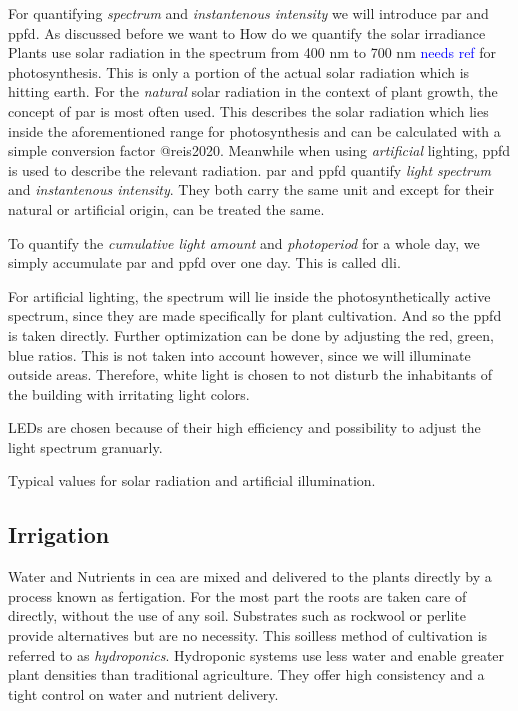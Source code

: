 For quantifying \textit{spectrum} and \textit{instantenous intensity} we will introduce \ac{par} and \ac{ppfd}.
As discussed before we want to 
How do we quantify the solar irradiance 
Plants use solar radiation in the spectrum from 400 nm to 700 nm \textcolor{Blue}{needs ref} for photosynthesis.
This is only a portion of the actual solar radiation which is hitting earth.
For the \textit{natural} solar radiation in the context of plant growth, the concept of \ac{par} is most often used.
This describes the solar radiation which lies inside the aforementioned range for photosynthesis and can be calculated with a simple conversion factor @reis2020.
Meanwhile when using \textit{artificial} lighting, \ac{ppfd} is used to describe the relevant radiation.
\ac{par} and \ac{ppfd} quantify \textit{light spectrum} and \textit{instantenous intensity}.
They both carry the same unit and except for their natural or artificial origin, can be treated the same.

To quantify the \textit{cumulative light amount} and \textit{photoperiod} for a whole day, we simply accumulate \ac{par} and \ac{ppfd} over one day.
This is called \ac{dli}.

For artificial lighting, the spectrum will lie inside the photosynthetically active spectrum, since they are made specifically for plant cultivation.
And so the ppfd is taken directly.
Further optimization can be done by adjusting the red, green, blue ratios.
This is not taken into account however, since we will illuminate outside areas.
Therefore, white light is chosen to not disturb the inhabitants of the building with irritating light colors.

LEDs are chosen because of their high efficiency and possibility to adjust the light spectrum granuarly.

Typical values for solar radiation and artificial illumination.



\subsection{Irrigation}
Water and Nutrients in \ac{cea} are mixed and delivered to the plants directly by a process known as fertigation.
For the most part the roots are taken care of directly, without the use of any soil.
Substrates such as rockwool or perlite provide alternatives but are no necessity.
This soilless method of cultivation is referred to as \textit{hydroponics}.
Hydroponic systems use less water and enable greater plant densities than traditional agriculture.
They offer high consistency and a tight control on water and nutrient delivery.

